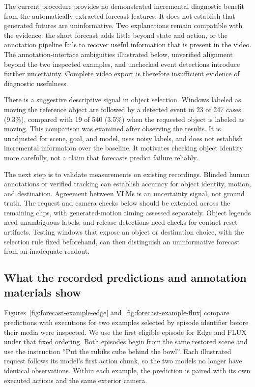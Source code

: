 \documentclass{article}
\begin{document}
The current procedure provides no demonstrated incremental diagnostic benefit from the automatically extracted forecast features. It does not establish that generated futures are uninformative. Two explanations remain compatible with the evidence: the short forecast adds little beyond state and action, or the annotation pipeline fails to recover useful information that is present in the video. The annotation-interface ambiguities illustrated below, unverified alignment beyond the two inspected examples, and unchecked event detections introduce further uncertainty. Complete video export is therefore insufficient evidence of diagnostic usefulness.

There is a suggestive descriptive signal in object selection. Windows labeled as moving the reference object are followed by a detected event in 23 of 247 cases (9.3\%), compared with 19 of 540 (3.5\%) when the requested object is labeled as moving. This comparison was examined after observing the results. It is unadjusted for scene, goal, and model, uses noisy labels, and does not establish incremental information over the baseline. It motivates checking object identity more carefully, not a claim that forecasts predict failure reliably.

The next step is to validate measurements on existing recordings. Blinded human annotations or verified tracking can establish accuracy for object identity, motion, and destination. Agreement between VLMs is an uncertainty signal, not ground truth. The request and camera checks below should be extended across the remaining clips, with generated-motion timing assessed separately. Object legends need unambiguous labels, and release detections need checks for contact-reset artifacts. Testing windows that expose an object or destination choice, with the selection rule fixed beforehand, can then distinguish an uninformative forecast from an inadequate readout.


\clearpage
\subsection{What the recorded predictions and annotation materials show}
\label{app:forecast-examples}

Figures~\ref{fig:forecast-example-edge} and~\ref{fig:forecast-example-flux} compare predictions with executions for two examples selected by episode identifier before their media were inspected. We use the first eligible episode for Edge and FLUX under that fixed ordering. Both episodes begin from the same restored scene and use the instruction ``Put the rubiks cube behind the bowl''. Each illustrated request follows its model's first action chunk, so the two models no longer have identical observations. Within each example, the prediction is paired with its own executed actions and the same exterior camera.
\end{document}
